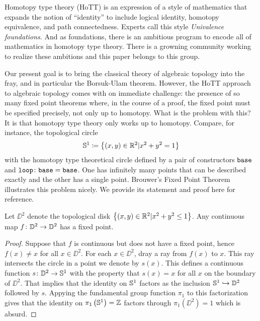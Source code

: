 \documentclass{amsart}
\begin{document}
Homotopy type theory (HoTT) is an expression of a style of
mathematics that expands the notion of ``identity'' to
include logical identity, homotopy equivalence, and path
connectedness.  Experts call this style \emph{Univalence
  foundations}. And as foundations, there is an ambitious
program to encode all of mathematics in homotopy type
theory. There is a growning community working to realize
these ambitions and this paper belongs to this group.

Our present goal is to bring the classical theory of
algebraic topology into the fray, and in particular the
Borsuk-Ulam theorem.  However, the HoTT approach to
algebraic topology comes with on immediate challenge: the
presence of so many fixed point theorems where, in the
course of a proof, the fixed point must be specified
precisely, not only up to homotopy.  What is the problem
with this?  It is that homotopy type theory only works up to
homotopy. Compare, for instance, the topological circle
$$ \mathbb{S}^1 \coloneqq \left\{ (x,y) \in \mathbb{R}^2 | x^2 + y^2 = 1
\right\} $$ with the homotopy type theoretical circle
defined by a pair of constructors $ \mathtt{base} $ and
$ \mathtt{loop} \colon \mathtt{base} = \mathtt{base}$. One has
infinitely many points that can be described exactly and the
other has a single point. Brouwer's Fixed Point Theorem
illustrates this problem nicely. We provide its statement
and proof here for reference.

\begin{theorem}
  Let $ \DD^2 $ denote the topological disk $ \left\{ (x,y)
      \in \mathbb{R}^2 | x^2 + y^2 \leq 1 \right\} $.  Any
  continuous map $ f \colon \mathbb{D}^2 \to \mathbb{D}^2 $ has a fixed point.
\end{theorem}

\begin{proof}
  Suppose that $ f $ is continuous but does not have a fixed
  point, hence $ f(x) \neq x $ for all $ x \in \DD^2 $.
  For each $ x \in \DD^2 $, dray a ray from $ f(x) $ to $ x
  $. This ray intersects the circle in a point we denote by
  $ s(x) $. This defines a continuous function $ s \colon
  \mathbb{D}^2 \to \mathbb{S}^1 $ with the property that $ s(x)=x $ for all $ x $ on
  the boundary of $ \DD^2 $.  That implies that the identity
  on $ \mathbb{S}^1 $ factors as the inclusion $ \mathbb{S}^1
  \hookrightarrow \mathbb{D}^2 $ followed by $ s $.  Appying the
  fundamental group function $ \pi_1 $ to this factorization
  gives that the identity on $ \pi_1 \left( \mathbb{S}^1 \right) =
  \mathbb{Z} $ factors through $ \pi_1 \left( \DD^2 \right) = 1 $
  which is absurd.
\end{proof}
\end{document}
